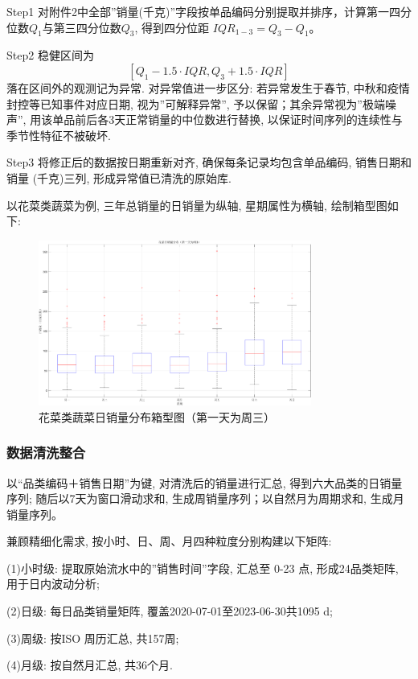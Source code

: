 \documentclass{MathNoteCN}
\begin{document}
Step1 对附件2中全部''销量(千克)''字段按单品编码分别提取并排序，计算第一四分位数$Q_1$与第三四分位数$Q_3$, 得到四分位距 $IQR_{1-3}=Q_3-Q_1$。

Step2 稳健区间为
\[ [Q_1 - 1.5 \cdot IQR, Q_3 + 1.5 \cdot IQR] \]
落在区间外的观测记为异常. 对异常值进一步区分: 
若异常发生于春节, 中秋和疫情封控等已知事件对应日期, 视为''可解释异常'', 予以保留；其余异常视为''极端噪声'', 用该单品前后各3天正常销量的中位数进行替换, 以保证时间序列的连续性与季节性特征不被破坏.  

Step3 将修正后的数据按日期重新对齐, 确保每条记录均包含单品编码, 销售日期和销量 (千克)三列, 形成异常值已清洗的原始库. 

以花菜类蔬菜为例, 三年总销量的日销量为纵轴, 星期属性为横轴, 绘制箱型图如下: 
\begin{figure}[H]
    \centering
    \includegraphics[width=0.8\textwidth]{花菜日销量分布(第一天为周3).png} 
    \caption{花菜类蔬菜日销量分布箱型图（第一天为周三）}
\end{figure}


\subsubsection{数据清洗整合}

以“品类编码＋销售日期”为键, 对清洗后的销量进行汇总, 得到六大品类的日销量序列; 随后以7天为窗口滑动求和, 生成周销量序列；以自然月为周期求和, 生成月销量序列。  

兼顾精细化需求, 按小时、日、周、月四种粒度分别构建以下矩阵: 

(1)小时级: 提取原始流水中的''销售时间''字段, 汇总至 0-23 点, 形成24品类矩阵, 用于日内波动分析; 

(2)日级: 每日品类销量矩阵, 覆盖2020-07-01至2023-06-30共1095 d;   

(3)周级: 按ISO 周历汇总, 共157周;   

(4)月级: 按自然月汇总, 共36个月. 
\end{document}
